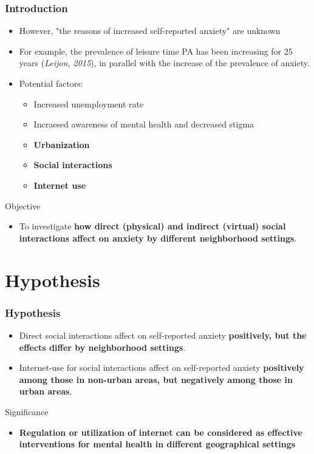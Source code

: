\documentclass[dvipdfmx]{beamer}\usepackage[]{graphicx}\usepackage[]{color}
\begin{document}
\begin{frame}
	\frametitle{Introduction}
	\begin{itemize}
		\item However, "the reasons of increased self-reported anxiety" are unknown
		\item For example, the prevalence of leisure time PA has been increasing for 25 years (\textit{Leijon, 2015}), in parallel with the increase of the prevalence of anxiety.
		\item Potential factors:
			\begin{itemize}
				\item Increased unemployment rate
				\item Incraesed awareness of mental health and decreased stigma
				\item \textbf{Urbanization}
				\item \textbf{Social interactions}
				\item \textbf{Internet use}
			\end{itemize}
	\end{itemize}
	\begin{block}{Objective}
		\begin{itemize}
			\item To investigate \textbf{how direct (physical) and indirect (virtual) social interactions affect on anxiety by different neighborhood settings}.
		\end{itemize}
	\end{block}
\end{frame}

\section{Hypothesis}
\begin{frame}
	\frametitle{Hypothesis}
		\begin{itemize}
			\item Direct social interactions affect on self-reported anxiety \textbf{positively, but the effects differ by neighborhood settings}.
			\item Internet-use for social interactions affect on self-reported anxiety \textbf{positively among those in non-urban areas, but negatively among those in urban areas}.
		\end{itemize}

		\begin{block}{Significance}
			\begin{itemize}
				\item \textbf{Regulation or utilization of internet can be considered as effective interventions for mental health in different geographical settings}
			\end{itemize}
		\end{block}

\end{frame}
\end{document}
